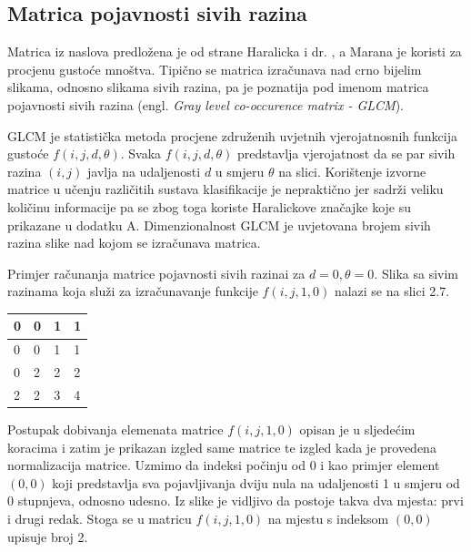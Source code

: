 \documentclass[times, utf8, zavrsni, numeric]{fer}
\begin{document}
\newpage

\subsection{Matrica pojavnosti sivih razina}

Matrica iz naslova predložena je od strane Haralicka i dr. \citep{haralick}, 
a Marana \citep{marana} je koristi za procjenu gustoće mnoštva.
Tipično se matrica izračunava nad crno bijelim slikama, odnosno slikama sivih razina,  pa je poznatija
pod imenom matrica pojavnosti sivih razina (engl. \textit{Gray level co-occurence matrix - GLCM}).

\bigbreak

GLCM je statistička metoda procjene združenih uvjetnih vjerojatnosnih funkcija
gustoće \(f(i,j,d,\theta)\). Svaka \(f(i,j,d,\theta)\) predstavlja vjerojatnost 
da se par sivih razina \((i,j)\) javlja na udaljenosti \(d\) u smjeru \(\theta\)
na slici. Korištenje izvorne matrice u učenju različitih sustava klasifikacije 
je nepraktično jer sadrži veliku količinu informacije pa se zbog toga koriste
Haralickove značajke koje su prikazane u dodatku A. Dimenzionalnost GLCM
je uvjetovana brojem sivih razina slike nad kojom se izračunava matrica.

\bigbreak

Primjer računanja matrice pojavnosti sivih razinai za \(d=0, \theta=0\). Slika 
sa sivim razinama koja služi za izračunavanje funkcije \(f(i,j,1,0)\) nalazi 
se na slici 2.7.

\bigbreak
\bigbreak

\begin{minipage}{\linewidth}
\centering
\begin{tabularx}{0.3\textwidth}{| X | X | X | X |}
\hline
0 & 0 & 1 & 1 \\ 
\hline
0 & 0 & 1 & 1 \\ 
\hline
0 & 2 & 2 & 2 \\
\hline
2 & 2 & 3 & 4 \\
\hline
\end{tabularx}
\end{minipage}

\bigbreak

Postupak dobivanja elemenata matrice \(f(i,j,1,0)\) opisan je u sljedećim koracima i zatim
je prikazan izgled same matrice te izgled kada je provedena normalizacija matrice. 
Uzmimo da indeksi počinju od 0 i kao primjer
element \((0,0)\) koji predstavlja sva pojavljivanja dviju nula na udaljenosti 1
u smjeru od 0 stupnjeva, odnosno udesno. Iz slike je vidljivo da postoje takva
dva mjesta: prvi i drugi redak. Stoga se u matricu \(f(i,j,1,0)\) na mjestu
s indeksom \((0,0)\) upisuje broj 2. 
\end{document}
